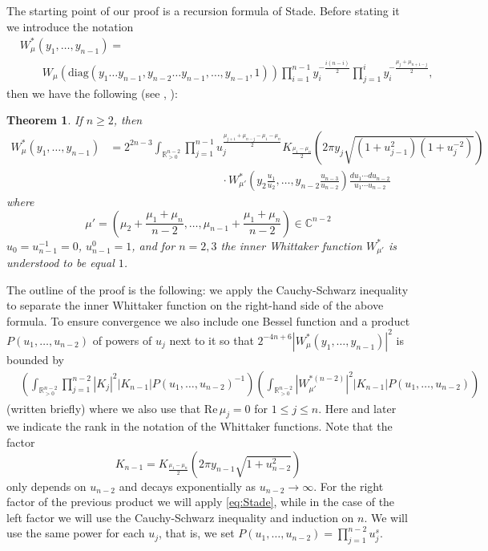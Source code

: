 \documentclass[11pt, oneside]{amsart}
\theoremstyle{plain}
\newtheorem{theorem}{Theorem}[section]
\theoremstyle{remark}
\newcommand{\R}{\mathbb{R}}
\newcommand{\C}{\mathbb{C}}
\renewcommand{\C}{\mathbb{C}}
\newcommand{\abs}[1]{\left|#1\right|}
\newcommand{\ree}{\mathrm{Re}\,}
\begin{document}
The starting point of our proof is a  recursion formula of  Stade.
Before stating it we introduce the notation
\begin{align*}
&W_\mu^*(y_1,\dots,y_{n-1})=\\
&\qquad W_\mu(\mathrm{diag}(y_1\dots y_{n-1},y_{n-2}\dots y_{n-1},\dots,y_{n-1},1))
\prod_{i=1}^{n-1}y_i^{-\frac{i(n-i)}{2}}
\prod_{j=1}^iy_i^{-\frac{\mu_j+\mu_{n+1-j}}{2}},
\end{align*}
then we have the following (see \cite[Equation (32)]{BHM20},  \cite[Equation (4.3)]{Sta01}):
\begin{theorem}
If $n\geq 2$, then
\begin{align*}
W_\mu^\ast(y_1,\dots,y_{n-1})&=2^{2n-3}\int_{\R_{>0}^{n-2}}\prod_{j=1}^{n-1}u_j^{\frac{\mu_{j+1}+\mu_{n-j}-\mu_1-\mu_n}2}K_{\frac{\mu_1-\mu_n}2}\left(2\pi y_j\sqrt{(1+u_{j-1}^2)(1+u_j^{-2})}\right)\\
	&\qquad\qquad\qquad\qquad\qquad\cdot W_{\mu'}^\ast\left(y_2\frac{u_1}{u_2},\dots,y_{n-2}\frac{u_{n-3}}{u_{n-2}}\right)\frac{du_1\cdots du_{n-2}}{u_1\cdots u_{n-2}}
\end{align*}
where
$$\mu'=\left(\mu_2+\frac{\mu_1+\mu_n}{n-2},\dots,\mu_{n-1}+\frac{\mu_1+\mu_n}{n-2}\right)\in\C^{n-2}$$
$u_0=u_{n-1}^{-1}=0$, $u_{n-1}^0=1$, and for $n=2,3$ the inner Whittaker function
$W^\ast_{\mu'}$ is understood to be equal $1$.
\end{theorem}
 The outline of the proof is the following:
 we apply the Cauchy-Schwarz inequality to separate the inner Whittaker function 
 on the right-hand side of the above formula. 
 To ensure convergence we also include  one Bessel function
 and a product  $P(u_1,\dots,u_{n-2})$ of powers of $u_j$ next to it so
 that $2^{-4n+6}|W_\mu^\ast(y_1,\dots,y_{n-1})|^2$ is bounded by 
\begin{align*}
	&\left(\int_{\R_{>0}^{n-2}}\prod_{j=1}^{n-2}\abs{K_j}^2\abs{K_{n-1}}P(u_1,\dots,u_{n-2})^{-1}\right)
    \left(\int_{\R_{>0}^{n-2}}\abs{W_{\mu'}^{\ast(n-2)}}^2\abs{K_{n-1}}P(u_1,\dots,u_{n-2})\right)\nonumber
\end{align*}
(written briefly)
where we also use that $\ree \mu_j=0$ for $1\leq j\leq n$.
Here and later we indicate the rank
in the notation of the Whittaker functions.
Note that the factor
$$K_{n-1}=K_{\frac{\mu_1-\mu_n}2 }\left(2\pi y_{n-1}\sqrt{1+u_{n-2}^2}\right)$$
only depends on
 $u_{n-2}$ and decays exponentially as $u_{n-2}\to\infty$.
For the right factor of the previous product we will apply \eqref{eq:Stade}, while
in the case of the left factor we will use the Cauchy-Schwarz inequality and induction on $n$. 
We will use the same power for each $u_j$, that is,
we set $P(u_1,\dots,u_{n-2})=\prod_{j=1}^{n-2}u_j^s$. 
\end{document}
